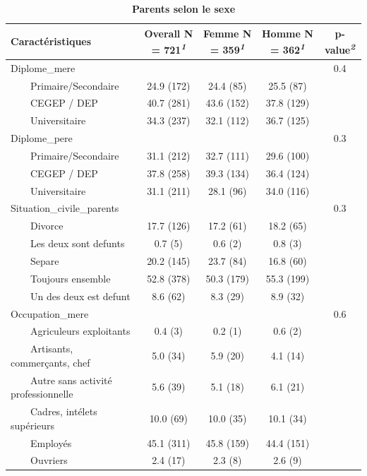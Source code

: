 \documentclass[
]{article}
\begin{document}
\newpage
\begin{table}[!t]
\caption{\label{tab:unnamed-chunk-18}\textbf{Parents selon le sexe}} 
\fontsize{12.0pt}{14.4pt}\selectfont
\begin{tabular*}{\linewidth}{@{\extracolsep{\fill}}lcccc}
\toprule
\textbf{Caractéristiques} & \textbf{Overall}  N = 721\textsuperscript{\textit{1}} & \textbf{Femme}  N = 359\textsuperscript{\textit{1}} & \textbf{Homme}  N = 362\textsuperscript{\textit{1}} & \textbf{p-value}\textsuperscript{\textit{2}} \\ 
\midrule\addlinespace[2.5pt]
Diplome\_mere &  &  &  & 0.4 \\ 
    Primaire/Secondaire & 24.9 (172) & 24.4 (85) & 25.5 (87) &  \\ 
    CEGEP / DEP & 40.7 (281) & 43.6 (152) & 37.8 (129) &  \\ 
    Universitaire & 34.3 (237) & 32.1 (112) & 36.7 (125) &  \\ 
Diplome\_pere &  &  &  & 0.3 \\ 
    Primaire/Secondaire & 31.1 (212) & 32.7 (111) & 29.6 (100) &  \\ 
    CEGEP / DEP & 37.8 (258) & 39.3 (134) & 36.4 (124) &  \\ 
    Universitaire & 31.1 (211) & 28.1 (96) & 34.0 (116) &  \\ 
Situation\_civile\_parents &  &  &  & 0.3 \\ 
    Divorce & 17.7 (126) & 17.2 (61) & 18.2 (65) &  \\ 
    Les deux sont defunts & 0.7 (5) & 0.6 (2) & 0.8 (3) &  \\ 
    Separe & 20.2 (145) & 23.7 (84) & 16.8 (60) &  \\ 
    Toujours ensemble & 52.8 (378) & 50.3 (179) & 55.3 (199) &  \\ 
    Un des deux est defunt & 8.6 (62) & 8.3 (29) & 8.9 (32) &  \\ 
Occupation\_mere &  &  &  & 0.6 \\ 
    Agriculeurs exploitants & 0.4 (3) & 0.2 (1) & 0.6 (2) &  \\ 
    Artisants, commerçants, chef & 5.0 (34) & 5.9 (20) & 4.1 (14) &  \\ 
    Autre sans activité professionnelle & 5.6 (39) & 5.1 (18) & 6.1 (21) &  \\ 
    Cadres, intélets supérieurs & 10.0 (69) & 10.0 (35) & 10.1 (34) &  \\ 
    Employés & 45.1 (311) & 45.8 (159) & 44.4 (151) &  \\ 
    Ouvriers & 2.4 (17) & 2.3 (8) & 2.6 (9) &  \\ 

\end{tabular*}
\end{table}
\end{document}
